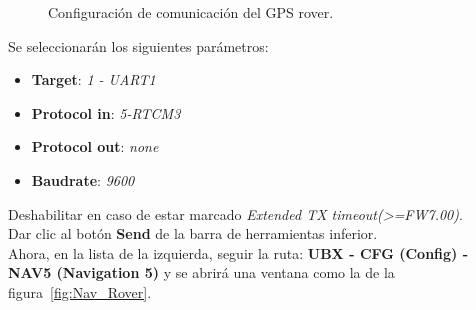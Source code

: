 \begin{figure}[H] %
\caption{Configuración de comunicación del GPS rover.}
\label{fig:PRT_Rover}
\end{figure}

Se seleccionarán los siguientes parámetros:

\begin{itemize}
\item \textbf{Target}: \textit{1 - UART1}
\item \textbf{Protocol in}: \textit{5-RTCM3}
\item \textbf{Protocol out}: \textit{none}
\item \textbf{Baudrate}: \textit{9600}
\end{itemize}

Deshabilitar en caso de estar marcado \textit{Extended TX timeout(>=FW7.00)}.\\

Dar clic al botón \textbf{Send} de la barra de herramientas inferior.\\

Ahora, en la lista de la izquierda, seguir la ruta: \textbf{UBX - CFG (Config) - NAV5 (Navigation 5)} y se abrirá una ventana como la de la figura~\ref{fig:Nav_Rover}.

